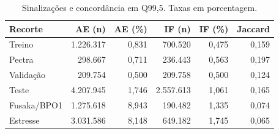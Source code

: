 \begin{table}[htbp]
\centering\small
\caption{Sinalizações e concordância em Q99,5. Taxas em porcentagem.}
\label{tab:sinalizacao}
\begin{tabular}{@{}lrrrrr@{}}
\toprule
Recorte & AE (n) & AE (\%) & IF (n) & IF (\%) & Jaccard \\
\midrule
Treino & 1.226.317 & 0,831 & 700.520 & 0,475 & 0,159 \\
Pectra & 298.667 & 0,711 & 236.443 & 0,563 & 0,197 \\
Validação & 209.754 & 0,500 & 209.758 & 0,500 & 0,124 \\
Teste & 4.207.945 & 1,746 & 2.557.613 & 1,061 & 0,165 \\
Fusaka/BPO1 & 1.275.618 & 8,943 & 190.482 & 1,335 & 0,074 \\
Estresse & 3.031.586 & 8,148 & 649.182 & 1,745 & 0,065 \\
\bottomrule
\end{tabular}
\end{table}
